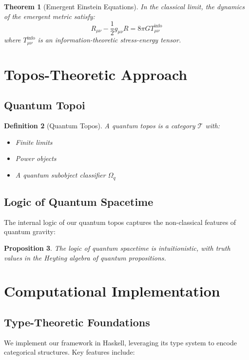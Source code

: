 \documentclass[11pt,a4paper]{article}
\newtheorem{theorem}{Theorem}[section]
\newtheorem{proposition}[theorem]{Proposition}
\newtheorem{definition}[theorem]{Definition}
\begin{document}
\begin{theorem}[Emergent Einstein Equations]
In the classical limit, the dynamics of the emergent metric satisfy:
\[
R_{\mu\nu} - \frac{1}{2}g_{\mu\nu}R = 8\pi G T_{\mu\nu}^{\text{info}}
\]
where $T_{\mu\nu}^{\text{info}}$ is an information-theoretic stress-energy tensor.
\end{theorem}

\section{Topos-Theoretic Approach}

\subsection{Quantum Topoi}

\begin{definition}[Quantum Topos]
A quantum topos is a category $\mathcal{T}$ with:
\begin{itemize}
\item Finite limits
\item Power objects
\item A quantum subobject classifier $\Omega_q$
\end{itemize}
\end{definition}

\subsection{Logic of Quantum Spacetime}

The internal logic of our quantum topos captures the non-classical features of quantum gravity:

\begin{proposition}
The logic of quantum spacetime is intuitionistic, with truth values in the Heyting algebra of quantum propositions.
\end{proposition}

\section{Computational Implementation}

\subsection{Type-Theoretic Foundations}

We implement our framework in Haskell, leveraging its type system to encode categorical structures. Key features include:
\end{document}
